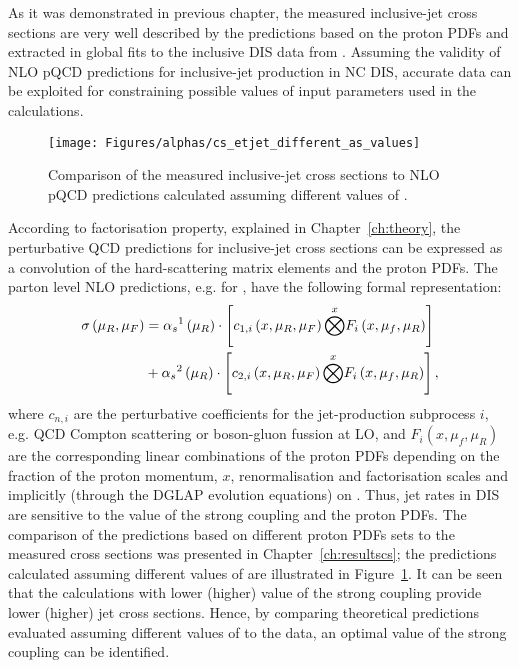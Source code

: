 As it was demonstrated in previous chapter, the measured inclusive-jet cross sections are very well described by the predictions based on the proton PDFs and \asz extracted in global fits to the inclusive DIS data from \hera. Assuming the validity of NLO pQCD predictions for inclusive-jet production in NC DIS, accurate data can be exploited for constraining possible values of input parameters used in the calculations.
\begin{figure}[t]
 \centering
 \texttt{[image: Figures/alphas/cs\_etjet\_different\_as\_values]}
 \caption{Comparison of the measured inclusive-jet cross sections to NLO pQCD predictions calculated assuming different values of \asz.}
 \label{fig:etjetdifferentas}
\end{figure}

According to factorisation property, explained in Chapter~\ref{ch:theory}, the perturbative QCD predictions for inclusive-jet cross sections can be expressed as a convolution of the hard-scattering matrix elements and the proton PDFs. The parton level NLO predictions, e.g. for \dsdetjetb, have the following formal representation:
\begin{equation}
	\begin{split}
\sigma\left( \mu_R, \mu_F\right)  &= \mbox{$\alpha_{s}$}^1\left( \mu_R\right) \cdot \left[ c_{1,i}\left( x, \mu_R, \mu_F\right) \overset{x}{\bigotimes } F_i\left( x, \mu_f, \mu_R \right) \right] \\
&+ \mbox{$\alpha_{s}$}^2\left( \mu_R\right) \cdot \left[ c_{2,i}\left( x, \mu_R, \mu_F\right) \overset{x}{\bigotimes } F_i\left( x, \mu_f, \mu_R \right) \right],
	\end{split}
\end{equation}
where $c_{n,i}$ are the perturbative coefficients for the jet-production subprocess $i$, e.g. QCD Compton scattering or boson-gluon fussion at LO, and $F_i\left( x, \mu_f, \mu_R \right)$ are the corresponding linear combinations of the proton PDFs depending on the fraction of the proton momentum, $x$, renormalisation and factorisation scales and implicitly (through the DGLAP evolution equations) on \as. Thus, jet rates in DIS are sensitive to the value of the strong coupling and the proton PDFs. The comparison of the predictions based on different proton PDFs sets to the measured cross sections was presented in Chapter~\ref{ch:resultscs}; the predictions calculated assuming different values of \asz are illustrated in Figure~\ref{fig:etjetdifferentas}. It can be seen that the calculations with lower (higher) value of the strong coupling provide lower (higher) jet cross sections. Hence, by comparing theoretical predictions evaluated assuming different values of \asz to the data, an optimal value of the strong coupling can be identified.

